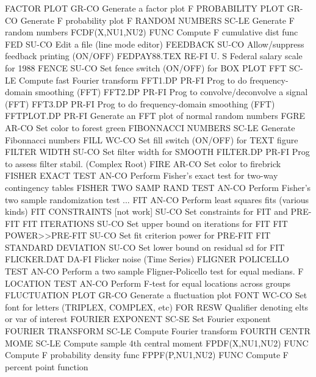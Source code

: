 FACTOR PLOT                 GR-CO Generate  a factor plot
F PROBABILITY PLOT          GR-CO Generate F probability plot
F RANDOM NUMBERS            SC-LE Generate F random numbers
FCDF(X,NU1,NU2)             FUNC  Compute F cumulative dist func
FED                         SU-CO Edit a file (line mode editor)
FEEDBACK                    SU-CO Allow/suppress feedback printing (ON/OFF)
FEDPAY88.TEX                RE-FI U. S Federal salary scale for 1988
FENCE                       SU-CO Set fence switch (ON/OFF) for BOX PLOT
FFT                         SC-LE Compute fast Fourier transform
FFT1.DP                     PR-FI Prog to do frequency-domain smoothing (FFT)
FFT2.DP                     PR-FI Prog to convolve/deconvolve a signal (FFT)
FFT3.DP                     PR-FI Prog to do frequency-domain smoothing (FFT)
FFTPLOT.DP                  PR-FI Generate an FFT plot of normal random numbers
FGRE                        AR-CO Set color to forest green
FIBONNACCI NUMBERS          SC-LE Generate Fibonnacci numbers
FILL                        WC-CO Set fill switch (ON/OFF) for TEXT figure
FILTER WIDTH                SU-CO Set filter width for SMOOTH
FILTER.DP                   PR-FI Prog to assess filter stabil. (Complex Root)
FIRE                        AR-CO Set color to firebrick
FISHER EXACT TEST           AN-CO Perform Fisher's exact test for two-way contingency tables
FISHER TWO SAMP RAND TEST   AN-CO Perform Fisher's two sample randomization test
... FIT                     AN-CO Perform least squares fits (various kinds)
FIT CONSTRAINTS [not work]  SU-CO Set constraints for FIT and PRE-FIT
FIT ITERATIONS              SU-CO Set upper bound on iterations for FIT
FIT POWER>>PRE-FIT          SU-CO Set fit criterion power for PRE-FIT
FIT STANDARD DEVIATION      SU-CO Set lower bound on residual sd for FIT
FLICKER.DAT                 DA-FI Flicker noise (Time Series)
FLIGNER POLICELLO TEST      AN-CO Perform a two sample Fligner-Policello test for equal medians.
F LOCATION TEST             AN-CO Perform F-test for equal locations across groups
FLUCTUATION PLOT            GR-CO Generate  a fluctuation plot
FONT                        WC-CO Set font for letters (TRIPLEX, COMPLEX, etc)
FOR                         RESW  Qualifier denoting elts or var of interest
FOURIER EXPONENT            SC-SE Set Fourier exponent
FOURIER TRANSFORM           SC-LE Compute Fourier transform
FOURTH CENTR MOME           SC-LE Compute sample 4th central moment
FPDF(X,NU1,NU2)             FUNC  Compute F probability density func
FPPF(P,NU1,NU2)             FUNC  Compute F percent point function
